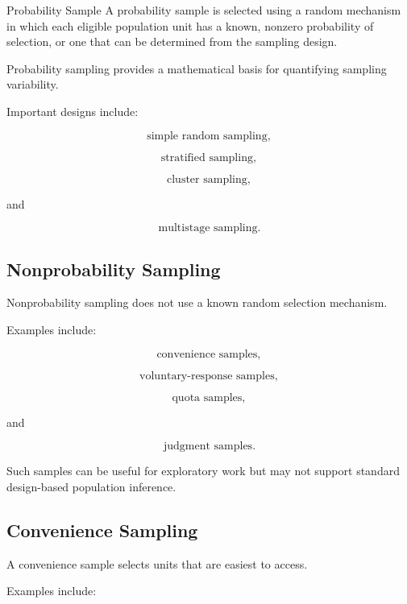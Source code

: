 \begin{definitionbox}{Probability Sample}
A probability sample is selected using a random mechanism in which each
eligible population unit has a known, nonzero probability of selection,
or one that can be determined from the sampling design.
\end{definitionbox}

Probability sampling provides a mathematical basis for quantifying
sampling variability.

Important designs include:

\[
\boxed{
\text{simple random sampling},
}
\]

\[
\boxed{
\text{stratified sampling},
}
\]

\[
\boxed{
\text{cluster sampling},
}
\]

and

\[
\boxed{
\text{multistage sampling}.
}
\]

\subsection{Nonprobability Sampling}
\label{subsec:nonprobability-sampling}

Nonprobability sampling does not use a known random selection mechanism.

Examples include:

\[
\boxed{
\text{convenience samples},
}
\]

\[
\boxed{
\text{voluntary-response samples},
}
\]

\[
\boxed{
\text{quota samples},
}
\]

and

\[
\boxed{
\text{judgment samples}.
}
\]

Such samples can be useful for exploratory work but may not support
standard design-based population inference.

\subsection{Convenience Sampling}
\label{subsec:convenience-sampling}

A convenience sample selects units that are easiest to access.

Examples include:

